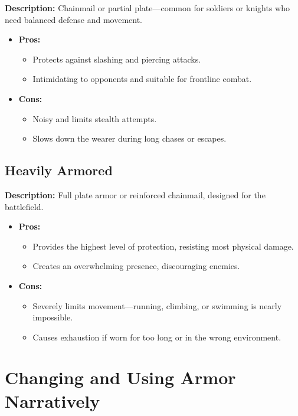 \documentclass[12pt]{book}
\begin{document}
\textbf{Description:} Chainmail or partial plate—common for soldiers or knights who need balanced defense and movement.

\begin{itemize}
    \item \textbf{Pros:}
    \begin{itemize}
        \item Protects against slashing and piercing attacks.
        \item Intimidating to opponents and suitable for frontline combat.
    \end{itemize}
    \item \textbf{Cons:}
    \begin{itemize}
        \item Noisy and limits stealth attempts.
        \item Slows down the wearer during long chases or escapes.
    \end{itemize}
\end{itemize}

\subsection*{Heavily Armored}

\textbf{Description:} Full plate armor or reinforced chainmail, designed for the battlefield.

\begin{itemize}
    \item \textbf{Pros:}
    \begin{itemize}
        \item Provides the highest level of protection, resisting most physical damage.
        \item Creates an overwhelming presence, discouraging enemies.
    \end{itemize}
    \item \textbf{Cons:}
    \begin{itemize}
        \item Severely limits movement—running, climbing, or swimming is nearly impossible.
        \item Causes exhaustion if worn for too long or in the wrong environment.
    \end{itemize}
\end{itemize}

\section{Changing and Using Armor Narratively}
\end{document}
